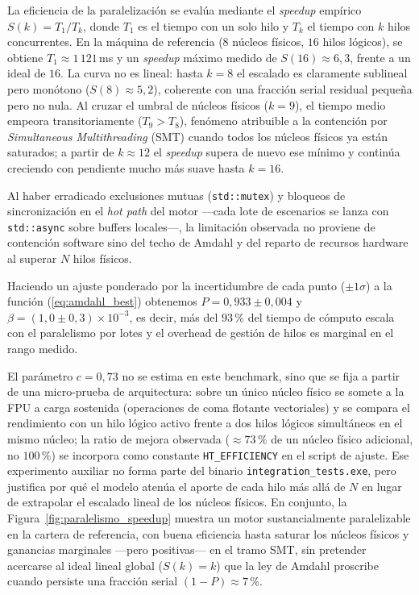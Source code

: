 \documentclass[11pt]{article}
\begin{document}
La eficiencia de la paralelización se evalúa mediante el \emph{speedup} empírico $S(k) = T_1 / T_k$, donde $T_1$ es el tiempo con un solo hilo y $T_k$ el tiempo con $k$ hilos concurrentes.
En la máquina de referencia ($8$ núcleos físicos, $16$ hilos lógicos), se obtiene $T_1 \approx 1\,121$\,ms y un \emph{speedup} máximo medido de $S(16) \approx 6{,}3$, frente a un ideal de $16$.
La curva no es lineal: hasta $k = 8$ el escalado es claramente sublineal pero monótono ($S(8) \approx 5{,}2$), coherente con una fracción serial residual pequeña pero no nula.
Al cruzar el umbral de núcleos físicos ($k = 9$), el tiempo medio empeora transitoriamente ($T_9 > T_8$), fenómeno atribuible a la contención por \emph{Simultaneous Multithreading}  (SMT) \cite{tullsen1995simultaneous} cuando todos los núcleos físicos ya están saturados; a partir de $k \approx 12$ el \emph{speedup} supera de nuevo ese mínimo y continúa creciendo con pendiente mucho más suave hasta $k = 16$.

Al haber erradicado exclusiones mutuas (\texttt{std::mutex}) y bloqueos de sincronización en el \emph{hot path} del motor ---cada lote de escenarios se lanza con \texttt{std::async} sobre buffers locales---, la limitación observada no proviene de contención software sino del techo de Amdahl y del reparto de recursos hardware al superar $N$ hilos físicos.

Haciendo un ajuste ponderado por la incertidumbre de cada punto ($\pm 1\sigma$) a la función (\ref{eq:amdahl_best}) obtenemos $P = 0{,}933 \pm 0{,}004$ y $\beta = (1{,}0 \pm 0{,}3)\times 10^{-3}$, es decir, más del $93\,\%$ del tiempo de cómputo escala con el paralelismo por lotes y el overhead de gestión de hilos es marginal en el rango medido.

El parámetro $c = 0{,}73$ no se estima en este benchmark, sino que se fija a partir de una micro-prueba de arquitectura: sobre un único núcleo físico se somete a la FPU a carga sostenida (operaciones de coma flotante vectoriales) y se compara el rendimiento con un hilo lógico activo frente a dos hilos lógicos simultáneos en el mismo núcleo; la ratio de mejora observada ($\approx 73\,\%$ de un núcleo físico adicional, no $100\,\%$) se incorpora como constante \texttt{HT\_EFFICIENCY} en el script de ajuste.
Ese experimento auxiliar no forma parte del binario \texttt{integration\_tests.exe}, pero justifica por qué el modelo atenúa el aporte de cada hilo más allá de $N$ en lugar de extrapolar el escalado lineal de los núcleos físicos.
En conjunto, la Figura~\ref{fig:paralelismo_speedup} muestra un motor sustancialmente paralelizable en la cartera de referencia, con buena eficiencia hasta saturar los núcleos físicos y ganancias marginales ---pero positivas--- en el tramo SMT, sin pretender acercarse al ideal lineal global ($S(k) = k$) que la ley de Amdahl proscribe cuando persiste una fracción serial $(1-P) \approx 7\,\%$.
\end{document}
